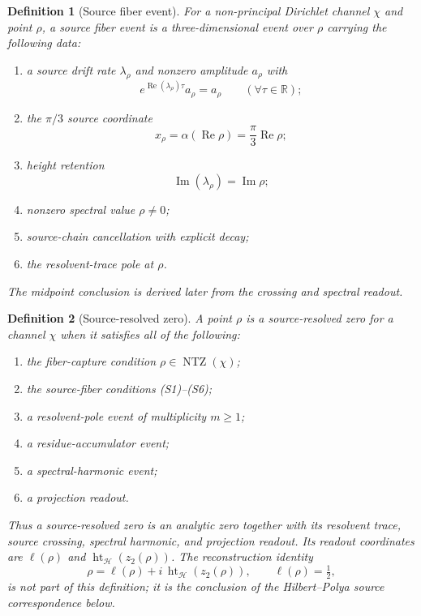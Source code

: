 \documentclass[11pt]{article}
\newtheorem{definition}{Definition}[section]
\DeclareMathOperator{\Ree}{Re}
\DeclareMathOperator{\Imm}{Im}
\DeclareMathOperator{\NTZ}{NTZ}
\DeclareMathOperator{\hgt}{ht}
\begin{document}
\begin{definition}[Source fiber event]
For a non-principal Dirichlet channel $\chi$ and point $\rho$, a source fiber
event is a three-dimensional event over $\rho$ carrying the following data:
\begin{enumerate}[label=(S\arabic*)]
\item a source drift rate $\lambda_\rho$ and nonzero amplitude $a_\rho$ with
\[
  e^{\Ree(\lambda_\rho)\tau}a_\rho=a_\rho
  \qquad(\forall \tau\in\mathbb R);
\]
\item the $\pi/3$ source coordinate
\[
  x_\rho=\alpha(\Ree\rho)=\frac{\pi}{3}\Ree\rho;
\]
\item height retention
\[
  \Imm(\lambda_\rho)=\Imm\rho;
\]
\item nonzero spectral value $\rho\ne0$;
\item source-chain cancellation with explicit decay;
\item the resolvent-trace pole at $\rho$.
\end{enumerate}
The midpoint conclusion is derived later from the crossing and spectral readout.
\end{definition}

\begin{definition}[Source-resolved zero]
A point $\rho$ is a \emph{source-resolved zero} for a channel $\chi$ when it
satisfies all of the following:
\begin{enumerate}[label=(\roman*)]
\item the fiber-capture condition $\rho\in\NTZ(\chi)$;
\item the source-fiber conditions (S1)--(S6);
\item a resolvent-pole event of multiplicity $m\ge1$;
\item a residue-accumulator event;
\item a spectral-harmonic event;
\item a projection readout.
\end{enumerate}
Thus a source-resolved zero is an analytic zero together with its resolvent
trace, source crossing, spectral harmonic, and projection readout.  Its readout
coordinates are $\ell(\rho)$ and $\hgt_{\mathcal H}(z_2(\rho))$.  The reconstruction
identity
\[
  \rho=\ell(\rho)+i\,\hgt_{\mathcal H}(z_2(\rho)),
  \qquad \ell(\rho)=\tfrac12,
\]
is \emph{not} part of this definition; it is the conclusion of the
Hilbert--Polya source correspondence below.
\end{definition}
\end{document}
